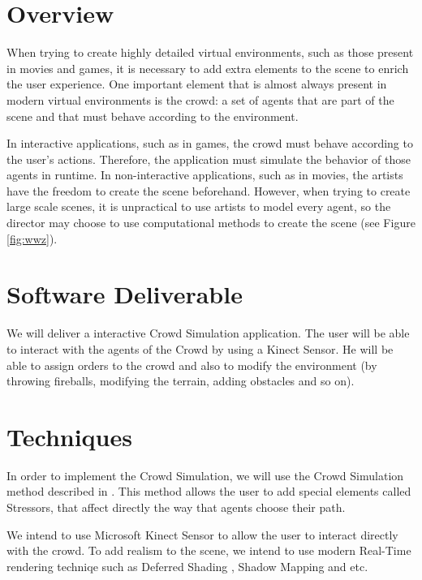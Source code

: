 \documentclass[conference, 12pt]{acmsiggraph}
\begin{document}
\TOGlinkslist


\copyrightspace

\section{Overview}

When trying to create highly detailed virtual environments, such as those present in movies and games, it is necessary to add extra elements to the scene to enrich the user experience. One important element that is almost always present in modern virtual environments is the crowd: a set of agents that are part of the scene and that must behave according to the environment.

In interactive applications, such as in games, the crowd must behave according to the user's actions. Therefore, the application must simulate the behavior of those agents in runtime. In non-interactive applications, such as in movies, the artists have the freedom to create the scene beforehand. However, when trying to create large scale scenes, it is unpractical to use artists to model every agent, so the director may choose to use computational methods to create the scene (see Figure \ref{fig:wwz}).

\section{Software Deliverable}
	We will deliver a interactive Crowd Simulation application. The user will be able to interact with the agents of the Crowd by using a Kinect Sensor. He will be able to assign orders to the crowd and also to modify the environment (by throwing fireballs, modifying the terrain, adding obstacles and so on).

\section{Techniques}
In order to implement the Crowd Simulation, we will use the Crowd Simulation method described in \cite{kim2012interactive}. This method allows the user to add special elements called Stressors, that affect directly the way that agents choose their path.

We intend to use Microsoft Kinect Sensor to allow the user to interact directly with the crowd. To add realism to the scene, we intend to use modern Real-Time rendering techniqe such as Deferred Shading \cite{hargreaves2004deferred}, Shadow Mapping \cite{Stamminger:2002:PSM:566654.566616} and etc.
\end{document}
